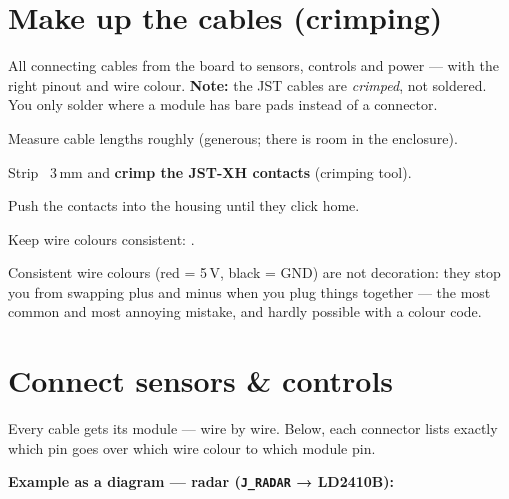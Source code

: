 \clearpage
\section{Make up the cables (crimping)}
\begin{ziel}
All connecting cables from the board to sensors, controls and power — with the right pinout
and wire colour. \textbf{Note:} the JST cables are \emph{crimped}, not soldered. You only
solder where a module has bare pads instead of a connector.
\end{ziel}
\begin{schritte}
  \item Measure cable lengths roughly (generous; there is room in the enclosure).
  \item Strip ~3\,mm and \textbf{crimp the JST-XH contacts} (crimping tool).
  \item Push the contacts into the housing until they click home.
  \item Keep wire colours consistent:  \quad {} \quad
         \quad {} \quad {} \quad
         \quad {}.
\end{schritte}
\begin{warum}
Consistent wire colours (red = 5\,V, black = GND) are not decoration: they stop you from
swapping plus and minus when you plug things together — the most common and most annoying
mistake, and hardly possible with a colour code.
\end{warum}

\clearpage
\section{Connect sensors \& controls}
\begin{ziel}
Every cable gets its module — wire by wire. Below, each connector lists exactly which pin
goes over which wire colour to which module pin.
\end{ziel}


\textbf{Example as a diagram — radar (\texttt{J\_RADAR} → LD2410B):}
\begin{center}\end{center}

